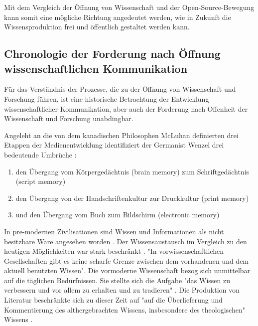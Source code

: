 Mit dem Vergleich der Öffnung von Wissenschaft und der Open-Source-Bewegung kann somit eine mögliche Richtung angedeutet werden\cite{Kuhlen_2002_universalaccess}, wie in Zukunft die Wissensproduktion frei und öffentlich gestaltet werden kann.

\subsection{Chronologie der Forderung nach Öffnung wissenschaftlichen Kommunikation}
Für das Verständnis der Prozesse, die zu der Öffnung von Wissenschaft und Forschung führen, ist eine historische Betrachtung der Entwicklung wissenschaftlicher Kommunikation, aber auch der Forderung nach Offenheit der Wissenschaft und Forschung unabdingbar.

Angeleht an die von dem kanadischen Philosophen McLuhan definierten drei Etappen der Medienentwicklung \cite{wunderlich_2008_buchdruck} identifiziert der Germanist Wenzel drei bedeutende Umbrüche \cite{wenzel_mediengeschichte_2007}:
\begin{enumerate}
\item den Übergang vom Körpergedächtnis (brain memory) zum Schriftgedächtnis (script memory)
\item den Übergang von der Handschriftenkultur zur Druckkultur (print memory)
\item und den Übergang vom Buch zum Bildschirm (electronic memory)
\end{enumerate}

In pre-modernen Zivilisationen sind Wissen und Informationen als nicht besitzbare Ware angesehen worden\cite{cite:18} \cite{steiner_1998_autorenhonorar}. Der Wissensaustausch im Vergleich zu den heutigen Möglichkeiten war stark beschränkt \cite{cite:17c}. "In vorwissenschaftlichen Gesellschaften gibt es keine scharfe Grenze zwischen dem vorhandenen und dem aktuell benutzten Wissen"\cite{Luhmann1998}. Die vormoderne Wissenschaft bezog sich unmittelbar auf die täglichen Bedürfnissen. Sie stellte sich die Aufgabe "das Wissen zu verbessern und vor allem zu erhalten und zu tradieren" \cite{Luhmann1998}. Die Produktion von Literatur beschränkte sich zu dieser Zeit auf "auf die Überlieferung und Kommentierung des althergebrachten Wissens, insbesondere des theologischen" Wissens \cite{steiner_1998_autorenhonorar}.

